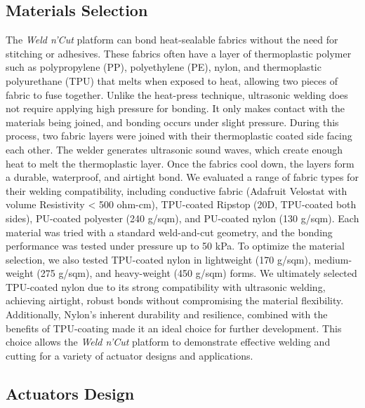 \documentclass[journal, letterpaper]{IEEEtran}
\begin{document}
\subsection{Materials Selection}
The \textit{Weld n'Cut} platform can bond heat-sealable fabrics without the need for stitching or adhesives. These fabrics often have a layer of thermoplastic polymer such as polypropylene (PP), polyethylene (PE), nylon, and thermoplastic polyurethane (TPU) that melts when exposed to heat, allowing two pieces of fabric to fuse together. Unlike the heat-press technique, ultrasonic welding does not require applying high pressure for bonding. It only makes contact with the materials being joined, and bonding occurs under slight pressure. During this process, two fabric layers were joined with their thermoplastic coated side facing each other. The welder generates ultrasonic sound waves, which create enough heat to melt the thermoplastic layer. Once the fabrics cool down, the layers form a durable, waterproof, and airtight bond.
We evaluated a range of fabric types for their welding compatibility, including conductive fabric (Adafruit Velostat with volume Resistivity < 500 ohm-cm), TPU-coated Ripstop (20D, TPU-coated both sides), PU-coated polyester (240 g/sqm), and PU-coated nylon (130 g/sqm). Each material was tried with a standard weld-and-cut geometry, and the bonding performance was tested under pressure up to 50 kPa.  
To optimize the material selection, we also tested TPU-coated nylon in lightweight (170 g/sqm), medium-weight (275 g/sqm), and heavy-weight (450 g/sqm) forms. We ultimately selected TPU-coated nylon due to its strong compatibility with ultrasonic welding, achieving airtight, robust bonds without compromising the material flexibility. Additionally, Nylon's inherent durability and resilience, combined with the benefits of TPU-coating made it an ideal choice for further development. This choice allows the \textit{Weld n'Cut} platform to demonstrate effective welding and cutting for a variety of actuator designs and applications.

\subsection{Actuators Design}
\end{document}
